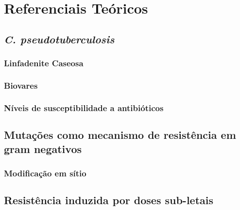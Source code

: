 \chapter{Referenciais Teóricos}
\label{cap:referenciais_teoricos}




\section{\textit{C. pseudotuberculosis }}
\subsection{Linfadenite Caseosa}
\subsection{Biovares}
\subsection{Níveis de susceptibilidade a antibióticos}
\section{Mutações como mecanismo de resistência em gram negativos}
\subsection{Modificação em sítio}
\section{Resistência induzida por doses sub-letais}
